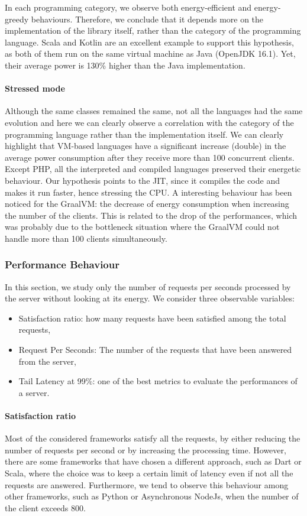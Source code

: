 In each programming category, we observe both energy-efficient and energy-greedy behaviours.
Therefore, we conclude that it depends more on the implementation of the library itself, rather than the category of the programming language.
Scala and Kotlin are an excellent example to support this hypothesis, as both of them run on the same virtual machine as Java (OpenJDK 16.1).
Yet, their average power is 130\% higher than the Java implementation.

\paragraph{Stressed mode}
Although the same classes remained the same, not all the languages had the same evolution and here we can clearly observe a correlation with the category of the programming language rather than the implementation itself.
We can clearly highlight that VM-based languages have a significant increase (double) in the average power consumption after they receive more than 100 concurrent clients.
Except PHP, all the interpreted and compiled languages preserved their energetic behaviour.
Our hypothesis points to the JIT, since it compiles the code and makes it run faster, hence stressing the CPU.
A interesting behaviour has been noticed for the GraalVM: the decrease of energy consumption when increasing the number of the clients.
This is related to the drop of the performances, which was probably due to the bottleneck situation where the GraalVM could not handle more than 100 clients simultaneously.

\subsubsection{Performance Behaviour}
In this section, we study only the number of requests per seconds processed by the server without looking at its energy.
We consider three observable variables:
\begin{itemize}
    \item \textsf{Satisfaction ratio}: how many requests have been satisfied among the total requests,
    \item \textsf{Request Per Seconds}: The number of the requests that have been answered from the server,
    \item \textsf{Tail Latency at 99\%}: one of the best metrics to evaluate the performances of a server.
\end{itemize}

\paragraph{Satisfaction ratio}
Most of the considered frameworks satisfy all the requests, by either reducing the number of requests per second or by increasing the processing time.
However, there are some frameworks that have chosen a different approach, such as Dart or Scala, where the choice was to keep a certain limit of latency even if not all the requests are answered.
Furthermore, we tend to observe this behaviour among other frameworks, such as Python or Asynchronous NodeJs, when the number of the client exceeds 800.

